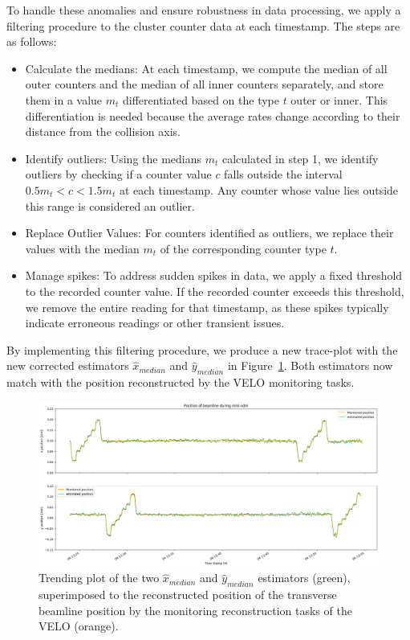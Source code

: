 To handle these anomalies and ensure robustness in data processing, we apply a filtering procedure to the cluster counter data at each timestamp. The steps are as follows:
\begin{itemize}
    \item Calculate the medians: At each timestamp, we compute the median of all outer counters and the median of all inner counters separately, and store them in a value $m_t$ differentiated based on the type $t$ outer or inner. This differentiation is needed because the average rates change according to their distance from the collision axis.
    \item Identify outliers: Using the medians $m_t$ calculated in step 1, we identify outliers by checking if a counter value $c$ falls outside the interval $0.5 m_t < c < 1.5 m_t$ at each timestamp. Any counter whose value lies outside this range is considered an outlier.
    \item Replace Outlier Values: For counters identified as outliers, we replace their values with the median $m_t$ of the corresponding counter type $t$.
    \item Manage spikes: To address sudden spikes in data, we apply a fixed threshold to the recorded counter value. If the recorded counter exceeds this threshold, we remove the entire reading for that timestamp, as these spikes typically indicate erroneous readings or other transient issues.
\end{itemize}

By implementing this filtering procedure, we produce a new trace-plot with the new corrected estimators $\hat{x}_{median}$ and $\hat{y}_{median}$ in Figure~\ref{fig:traceplot_off}. Both estimators now match with the position reconstructed by the VELO monitoring tasks. 

\begin{figure}
    \centering
    \includegraphics[width=\textwidth]{figures/traceplot_zoom.png}
    \caption{Trending plot of the two $\hat{x}_{median}$ and $\hat{y}_{median}$ estimators (green), superimposed to the reconstructed position of the transverse beamline position by the monitoring reconstruction tasks of the VELO (orange).}
    \label{fig:traceplot_off}
\end{figure}

